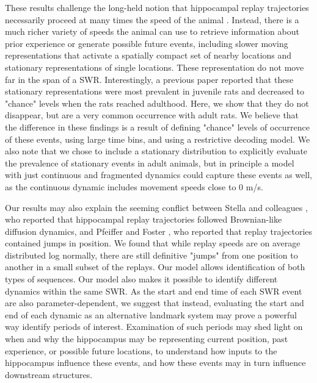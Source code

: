 \documentclass[times, twoside]{zHenriquesLab-StyleBioRxiv}
\begin{document}
These results challenge the long-held notion that hippocampal replay trajectories necessarily proceed at many times the speed of the animal \cite{NadasdyReplayTimeCompression1999, LeeMemorySequentialExperience2002, DavidsonHippocampalReplayExtended2009}. Instead, there is a much richer variety of speeds the animal can use to retrieve information about prior experience or generate possible future events, including slower moving representations that activate a spatially compact set of nearby locations and stationary representations of single locations. These representation do not move far in the span of a SWR. Interestingly, a previous paper \cite{FarooqEmergencepreconfiguredplastic2019} reported that these stationary representations were most prevalent in juvenile rats and decreased to "chance" levels when the rats reached adulthood. Here, we show that they do not disappear, but are a very common occurrence with adult rats. We believe that the difference in these findings is a result of defining "chance" levels of occurrence of these events, using large time bins, and using a restrictive decoding model. We also note that we chose to include a stationary distribution to explicitly evaluate the prevalence of stationary events in adult animals, but in principle a model with just continuous and fragmented dynamics could capture these events as well, as the continuous dynamic includes movement speeds close to 0 m/s.

Our results may also explain the seeming conflict between Stella and colleagues \cite{StellaHippocampalReactivationRandom2019}, who reported that hippocampal replay trajectories followed Brownian-like diffusion dynamics, and Pfeiffer and Foster \cite{PfeifferAutoassociativedynamicsgeneration2015}, who reported that replay trajectories contained jumps in position. We found that while replay speeds are on average distributed log normally, there are still definitive "jumps" from one position to another in a small subset of the replays. Our model allows identification of both types of sequences. Our model also makes it possible to identify different dynamics within the same SWR. As the start and end time of each SWR event are also parameter-dependent, we suggest that instead, evaluating the start and end of each dynamic as an alternative landmark system may prove a powerful way identify periods of interest. Examination of such periods may shed light on when and why the hippocampus may be representing current position, past experience, or possible future locations, to understand how inputs to the hippocampus influence these events, and how these events may in turn influence downstream structures.
\end{document}
